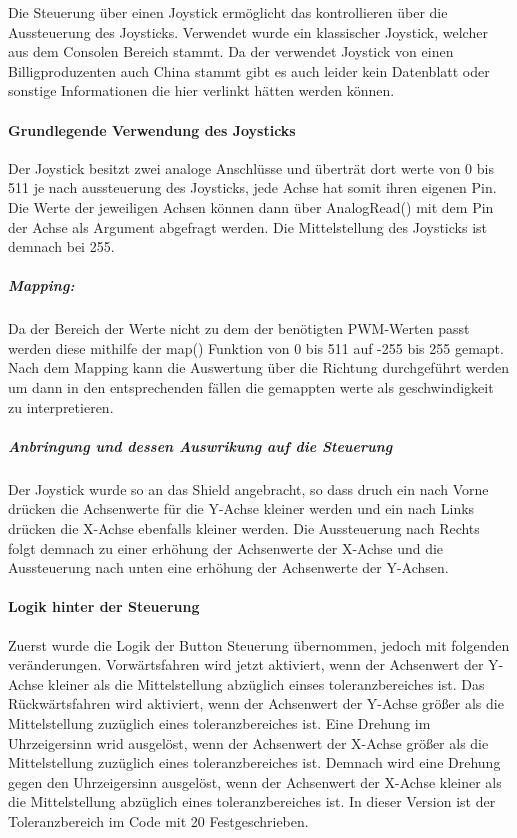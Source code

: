 \documentclass{article}
\begin{document}
Die Steuerung über einen Joystick ermöglicht das kontrollieren über die Aussteuerung des Joysticks. Verwendet wurde ein klassischer Joystick, welcher aus dem Consolen Bereich stammt. Da der verwendet Joystick von einen Billigproduzenten auch China stammt gibt es auch leider kein Datenblatt oder sonstige Informationen die hier verlinkt hätten werden können.

\paragraph{Grundlegende Verwendung des Joysticks}
Der Joystick besitzt zwei analoge Anschlüsse und überträt dort werte von 0 bis 511 je nach aussteuerung des Joysticks, jede Achse hat somit ihren eigenen Pin.
Die Werte der jeweiligen Achsen können dann über AnalogRead() mit dem Pin der Achse als Argument abgefragt werden.
Die Mittelstellung des Joysticks ist demnach bei 255.
\subparagraph{Mapping:}
Da der Bereich der Werte nicht zu dem der benötigten PWM-Werten passt werden diese mithilfe der map() Funktion von 0 bis 511 auf -255 bis 255 gemapt. 
Nach dem Mapping kann die Auswertung über die Richtung durchgeführt werden um dann in den entsprechenden fällen die gemappten werte als geschwindigkeit zu interpretieren.
\subparagraph{Anbringung und dessen Auswrikung auf die Steuerung}
Der Joystick wurde so an das Shield angebracht, so dass druch ein nach Vorne drücken die Achsenwerte für die Y-Achse kleiner werden und ein nach Links drücken die X-Achse ebenfalls kleiner werden. Die Aussteuerung nach Rechts folgt demnach zu einer erhöhung der Achsenwerte der X-Achse und die Aussteuerung nach unten eine erhöhung der Achsenwerte der Y-Achsen.   
\paragraph{Logik hinter der Steuerung}
Zuerst wurde die Logik der Button Steuerung übernommen, jedoch mit folgenden veränderungen. 
Vorwärtsfahren wird jetzt aktiviert, wenn der Achsenwert der Y-Achse kleiner als die Mittelstellung abzüglich einses toleranzbereiches ist.
Das Rückwärtsfahren wird aktiviert, wenn der Achsenwert der Y-Achse größer als die Mittelstellung zuzüglich eines toleranzbereiches ist.
Eine Drehung im Uhrzeigersinn wrid ausgelöst, wenn der Achsenwert der X-Achse größer als die Mittelstellung zuzüglich eines toleranzbereiches ist. Demnach wird eine Drehung gegen den Uhrzeigersinn ausgelöst, wenn der Achsenwert der X-Achse kleiner als die Mittelstellung abzüglich eines toleranzbereiches ist.
In dieser Version ist der Toleranzbereich im Code mit 20 Festgeschrieben.
\end{document}
